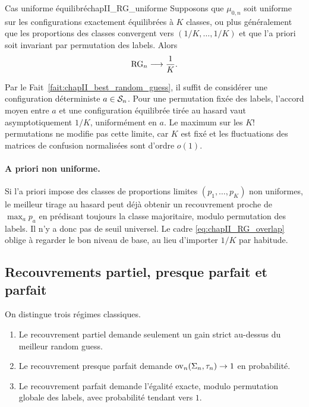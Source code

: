 \begin{Fait}{Cas uniforme équilibré}{chapII_RG_uniforme}
Supposons que $\mu_{0,n}$ soit uniforme sur les configurations exactement équilibrées à $K$ classes, ou plus généralement que les proportions des classes convergent vers $(1/K,\ldots,1/K)$ et que l'a priori soit invariant par permutation des labels. Alors
\begin{equation}
    \operatorname{RG}_n\longrightarrow \frac1K.
    \label{eq:chapII_RG_uniforme}
\end{equation}
\end{Fait}

\begin{Preuve}
Par le Fait~\ref{fait:chapII_best_random_guess}, il suffit de considérer une configuration déterministe $a\in\mathcal S_n$. Pour une permutation fixée des labels, l'accord moyen entre $a$ et une configuration équilibrée tirée au hasard vaut asymptotiquement $1/K$, uniformément en $a$. Le maximum sur les $K!$ permutations ne modifie pas cette limite, car $K$ est fixé et les fluctuations des matrices de confusion normalisées sont d'ordre $o(1)$.
\end{Preuve}

\paragraph{A priori non uniforme.}
Si l'a priori impose des classes de proportions limites $(p_1,\ldots,p_K)$ non uniformes, le meilleur tirage au hasard peut déjà obtenir un recouvrement proche de $\max_a p_a$ en prédisant toujours la classe majoritaire, modulo permutation des labels. Il n'y a donc pas de seuil universel. Le cadre \eqref{eq:chapII_RG_overlap} oblige à regarder le bon niveau de base, au lieu d'importer $1/K$ par habitude.

\subsection{Recouvrements partiel, presque parfait et parfait}

On distingue trois régimes classiques.
\begin{enumerate}
    \item Le recouvrement partiel demande seulement un gain strict au-dessus du meilleur random guess.
    \item Le recouvrement presque parfait demande $\operatorname{ov}_n(\Sigma_n,\tau_n)\to1$ en probabilité.
    \item Le recouvrement parfait demande l'égalité exacte, modulo permutation globale des labels, avec probabilité tendant vers $1$.
\end{enumerate}

